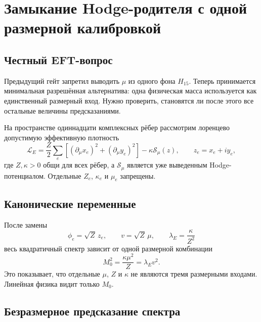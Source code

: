 \chapter{Замыкание Hodge-родителя с одной размерной калибровкой}
\label{ch:v7-single-scale-calibration-closure-gate}

\section{Честный EFT-вопрос}

Предыдущий гейт запретил выводить $\mu$ из одного фона $H_{15}$. Теперь
принимается минимальная разрешённая альтернатива: одна физическая масса
используется как единственный размерный вход. Нужно проверить, становятся ли
после этого все остальные величины предсказаниями.

На пространстве одиннадцати комплексных рёбер рассмотрим лоренцево
допустимую эффективную плотность
\begin{equation}
 \mathcal L_E
 =\frac{Z}{2}\sum_e\left[(\partial_\mu x_e)^2
 +(\partial_\mu y_e)^2\right]
 -\kappa\mathcal S_\mu(z),
 \qquad z_e=x_e+iy_e,
 \label{eq:v7-single-scale-effective-lagrangian}
\end{equation}
где $Z,\kappa>0$ общи для всех рёбер, а $\mathcal S_\mu$ является уже
выведенным Hodge-потенциалом. Отдельные $Z_e$, $\kappa_e$ и $\mu_e$
запрещены.

\section{Канонические переменные}

После замены
\begin{equation}
 \phi_e=\sqrt Z\,z_e,
 \qquad
 v=\sqrt Z\,\mu,
 \qquad
 \lambda_E=\frac{\kappa}{Z^2}
 \label{eq:v7-single-scale-canonical-variables}
\end{equation}
весь квадратичный спектр зависит от одной размерной комбинации
\begin{equation}
 M_0^2=\frac{\kappa\mu^2}{Z}=\lambda_Ev^2.
 \label{eq:v7-single-scale-common-mass}
\end{equation}
Это показывает, что отдельные $\mu$, $Z$ и $\kappa$ не являются тремя
размерными входами. Линейная физика видит только $M_0$.

\section{Безразмерное предсказание спектра}

